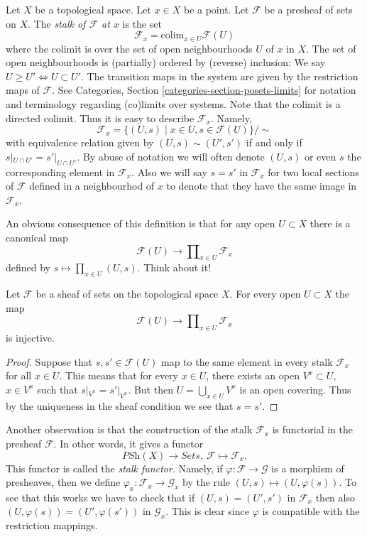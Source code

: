 \noindent
Let $X$ be a topological space. Let $x \in X$ be a point.
Let $\mathcal{F}$ be a presheaf of sets on $X$.
The {\it stalk of $\mathcal{F}$ at $x$} is the set
$$
\mathcal{F}_x
=
\text{colim}_{x\in U} \mathcal{F}(U)
$$
where the colimit is over the set of open neighbourhoods
$U$ of $x$ in $X$. The set of open neighbourhoods is (partially)
ordered by (reverse) inclusion:
We say $U \geq U' \Leftrightarrow U \subset U'$.
The transition maps in the system are
given by the restriction maps of $\mathcal{F}$.
See Categories, Section \ref{categories-section-posets-limits}
for notation and terminology regarding (co)limits over systems.
Note that the colimit is a directed colimit.
Thus it is easy to describe $\mathcal{F}_x$. Namely,
$$
\mathcal{F}_x
=
\{
(U,s)
\mid
x\in U, s\in \mathcal{F}(U)
\}/\sim
$$
with equivalence relation given by $(U,s) \sim (U', s')$
if and only if $s|_{U\cap U'} = s'|_{U\cap U'}$. By abuse of
notation we will often denote $(U, s)$
or even $s$ the corresponding element in $\mathcal{F}_x$.
Also we will say $s = s'$ in $\mathcal{F}_x$ for two local sections
of $\mathcal{F}$ defined in a neighbourhod of $x$ to denote that
they have the same image in $\mathcal{F}_x$.

\medskip\noindent
An obvious consequence of this definition is that
for any open $U \subset X$ there is a canonical map
$$
\mathcal{F}(U) 
\longrightarrow
\prod\nolimits_{x \in U} \mathcal{F}_x
$$
defined by $s \mapsto \prod_{x \in U} (U, s)$. Think about it!

\begin{lemma}
\label{lemma-sheaf-subset-stalks}
Let $\mathcal{F}$ be a sheaf of sets on the topological space $X$.
For every open $U \subset X$ the map
$$
\mathcal{F}(U) 
\longrightarrow
\prod\nolimits_{x \in U} \mathcal{F}_x
$$
is injective.
\end{lemma}

\begin{proof}
Suppose that $s, s' \in \mathcal{F}(U)$ map to the same element
in every stalk $\mathcal{F}_x$ for all $x \in U$. This means that
for every $x \in U$, there exists an open $V^x \subset U$,
$x \in V^x$ such that $s|_{V^x} = s'|_{V^x}$. But then
$U = \bigcup_{x \in U} V^x$ is an open covering. Thus by the
uniqueness in the sheaf condition we see that $s = s'$.
\end{proof}

\noindent
Another observation is that the construction of the stalk
$\mathcal{F}_x$ is functorial in the presheaf $\mathcal{F}$.
In other words, it gives a functor
$$
\textit{PSh}(X) \longrightarrow \textit{Sets},
\ \mathcal{F} \longmapsto \mathcal{F}_x.
$$
This functor is called the {\it stalk functor}.
Namely, if $\varphi : \mathcal{F} \to \mathcal{G}$ is 
a morphism of presheaves, then we define
$\varphi_x : \mathcal{F}_x \to \mathcal{G}_x$
by the rule $(U, s) \mapsto (U, \varphi(s))$.
To see that this works we have to check that
if $(U, s) = (U', s')$ in $\mathcal{F}_x$ then also
$(U, \varphi(s)) = (U', \varphi(s'))$ in $\mathcal{G}_x$.
This is clear since $\varphi$ is compatible with the
restriction mappings.

